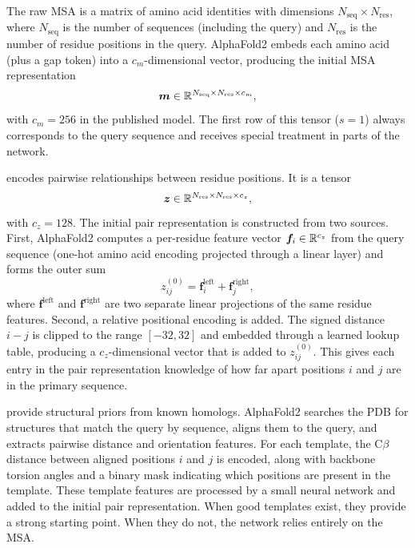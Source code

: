 The raw MSA is a matrix of amino acid identities with dimensions $N_\text{seq} \times N_\text{res}$, where $N_\text{seq}$ is the number of sequences (including the query) and $N_\text{res}$ is the number of residue positions in the query.
AlphaFold2 embeds each amino acid (plus a gap token) into a $c_m$-dimensional vector, producing the initial MSA representation
\begin{equation}
\label{eq:msa-rep}
\bm{m} \in \mathbb{R}^{N_\text{seq} \times N_\text{res} \times c_m},
\end{equation}
with $c_m = 256$ in the published model.
The first row of this tensor ($s = 1$) always corresponds to the query sequence and receives special treatment in parts of the network.

 encodes pairwise relationships between residue positions.
It is a tensor
\begin{equation}
\label{eq:pair-rep}
\bm{z} \in \mathbb{R}^{N_\text{res} \times N_\text{res} \times c_z},
\end{equation}
with $c_z = 128$.
The initial pair representation is constructed from two sources.
First, AlphaFold2 computes a per-residue feature vector $\bm{f}_i \in \mathbb{R}^{c_z}$ from the query sequence (one-hot amino acid encoding projected through a linear layer) and forms the outer sum
\begin{equation}
\label{eq:pair-init}
z_{ij}^{(0)} = \bm{f}_i^{\text{left}} + \bm{f}_j^{\text{right}},
\end{equation}
where $\bm{f}^{\text{left}}$ and $\bm{f}^{\text{right}}$ are two separate linear projections of the same residue features.
Second, a relative positional encoding is added.
The signed distance $i - j$ is clipped to the range $[-32, 32]$ and embedded through a learned lookup table, producing a $c_z$-dimensional vector that is added to $z_{ij}^{(0)}$.
This gives each entry in the pair representation knowledge of how far apart positions $i$ and $j$ are in the primary sequence.

 provide structural priors from known homologs.
AlphaFold2 searches the PDB for structures that match the query by sequence, aligns them to the query, and extracts pairwise distance and orientation features.
For each template, the C$\beta$ distance between aligned positions $i$ and $j$ is encoded, along with backbone torsion angles and a binary mask indicating which positions are present in the template.
These template features are processed by a small neural network and added to the initial pair representation.
When good templates exist, they provide a strong starting point.
When they do not, the network relies entirely on the MSA.

